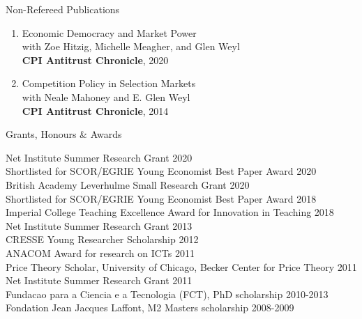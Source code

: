 \documentclass{resume}
\begin{document}

\begin{rSection}{Non-Refereed Publications}
	
\begin{enumerate}

\item Economic Democracy and Market Power\\
with Zoe Hitzig, Michelle Meagher, and Glen Weyl \\ 
\textbf{CPI Antitrust Chronicle}, 2020


\item Competition Policy in Selection Markets\\ 
with Neale Mahoney and E. Glen Weyl \\ 
\textbf{CPI Antitrust Chronicle}, 2014
	
		
\end{enumerate}


\end{rSection}




\begin{rSection}{Grants, Honours \& Awards}

Net Institute Summer Research Grant \hfill {2020}
\\ Shortlisted for SCOR/EGRIE Young Economist Best Paper Award \hfill 2020
\\ British Academy Leverhulme Small Research Grant \hfill 2020
\\ Shortlisted for SCOR/EGRIE Young Economist Best Paper Award \hfill 2018
\\Imperial College Teaching Excellence Award for Innovation in Teaching \hfill 2018
\\ Net Institute Summer Research Grant \hfill {2013}
\\ CRESSE Young Researcher Scholarship \hfill {2012}
\\ ANACOM Award for research on ICTs \hfill {2011}
\\ Price Theory Scholar, University of Chicago, Becker Center for Price Theory \hfill {2011}
\\ Net Institute Summer Research Grant \hfill {2011}
\\ Fundacao para a Ciencia e a Tecnologia (FCT), PhD scholarship \hfill {2010-2013}
\\ Fondation Jean Jacques Laffont, M2 Masters scholarship \hfill 2008-2009

\end{rSection}
\end{document}
